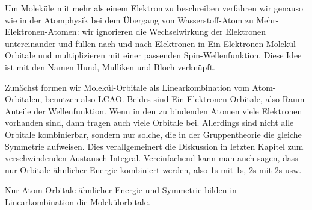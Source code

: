 Um Moleküle mit mehr als einem Elektron zu beschreiben verfahren wir genauso wie in der Atomphysik bei dem Übergang von Wasserstoff-Atom zu Mehr-Elektronen-Atomen: wir ignorieren die Wechselwirkung der Elektronen untereinander und füllen nach und nach Elektronen in Ein-Elektronen-Molekül-Orbitale und multiplizieren mit einer passenden Spin-Wellenfunktion. Diese Idee ist mit den Namen Hund, Mulliken und Bloch verknüpft.

Zunächst formen wir Molekül-Orbitale als Linearkombination vom Atom-Orbitalen, benutzen also LCAO. Beides sind Ein-Elektronen-Orbitale, also Raum-Anteile der Wellenfunktion. Wenn in den zu bindenden Atomen viele Elektronen vorhanden sind, dann tragen auch viele Orbitale bei.  Allerdings sind nicht alle Orbitale kombinierbar, sondern nur solche, die in der Gruppentheorie die gleiche Symmetrie aufweisen. Dies verallgemeinert die  Diskussion in letzten Kapitel zum verschwindenden Austausch-Integral. Vereinfachend kann man auch sagen, dass nur Orbitale ähnlicher Energie kombiniert werden, also 1s mit 1s, 2s mit 2s usw. 

\begin{marginfigure}
\centering

 \begin{modiagram}[labels, names, AO-width=6pt, distance=3cm]
 

    
\end{modiagram}
\caption{Nur Atom-Orbitale ähnlicher Energie und Symmetrie bilden in Linearkombination die Molekülorbitale. }
\end{marginfigure}



